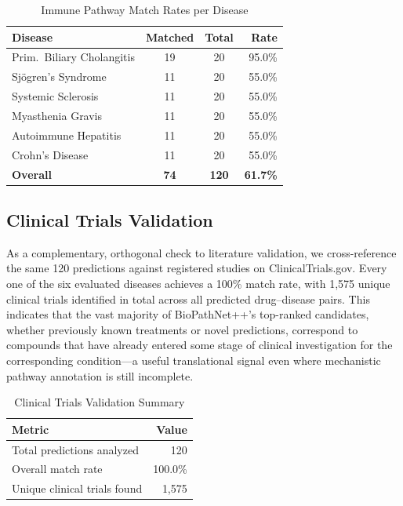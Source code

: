 \documentclass[conference]{IEEEtran}
\begin{document}
\begin{table}[!t]
\caption{Immune Pathway Match Rates per Disease}
\label{tab:pathway}
\centering
\footnotesize
\renewcommand{\arraystretch}{1.4}
\begin{tabular}{p{2.8cm}ccr}
\toprule
\textbf{Disease} & \textbf{Matched} & \textbf{Total} & \textbf{Rate} \\
\midrule
Prim.\ Biliary Cholangitis & 19 & 20 & 95.0\% \\
Sj\"{o}gren's Syndrome & 11 & 20 & 55.0\% \\
Systemic Sclerosis & 11 & 20 & 55.0\% \\
Myasthenia Gravis & 11 & 20 & 55.0\% \\
Autoimmune Hepatitis & 11 & 20 & 55.0\% \\
Crohn's Disease & 11 & 20 & 55.0\% \\
\midrule
\textbf{Overall} & \textbf{74} & \textbf{120} & \textbf{61.7\%} \\
\bottomrule
\end{tabular}
\end{table}

\subsection{Clinical Trials Validation}

As a complementary, orthogonal check to literature validation, we cross-reference the same 120 predictions against registered studies on ClinicalTrials.gov. Every one of the six evaluated diseases achieves a 100\% match rate, with 1,575 unique clinical trials identified in total across all predicted drug--disease pairs. This indicates that the vast majority of BioPathNet++'s top-ranked candidates, whether previously known treatments or novel predictions, correspond to compounds that have already entered some stage of clinical investigation for the corresponding condition---a useful translational signal even where mechanistic pathway annotation is still incomplete.

\begin{table}[!t]
\caption{Clinical Trials Validation Summary}
\label{tab:clinical}
\centering
\footnotesize
\renewcommand{\arraystretch}{1.4}
\begin{tabular}{p{3.5cm}r}
\toprule
\textbf{Metric} & \textbf{Value} \\
\midrule
Total predictions analyzed & 120 \\
Overall match rate & 100.0\% \\
Unique clinical trials found & 1,575 \\
\bottomrule
\end{tabular}
\end{table}
\end{document}

